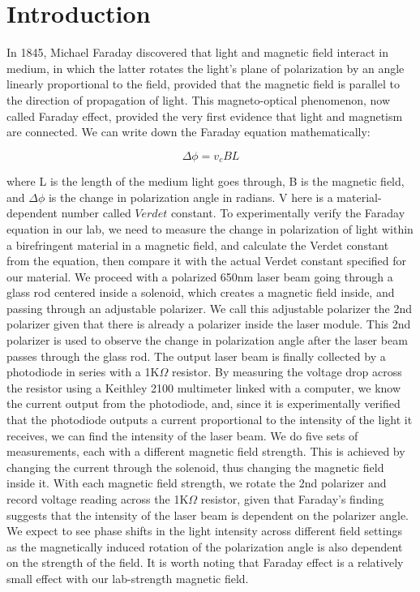 \documentclass[prb,preprint]{revtex4-1}
\begin{document}
\section{Introduction} 

In 1845, Michael Faraday discovered that light and magnetic field interact in medium, in which the latter rotates the light's plane of polarization by an angle linearly proportional to the field, provided that the magnetic field is parallel to the direction of propagation of light. This magneto-optical phenomenon, now called Faraday effect, provided the very first evidence that light and magnetism are connected. We can write down the Faraday equation mathematically:

\begin{equation*}
\label{faraday}
\Delta\phi =v_cBL
\end{equation*}

where L is the length of the medium light goes through, B is the magnetic field, and $\Delta\phi$ is the change in polarization angle in radians. V here is a material-dependent number called $Verdet$ constant.
To experimentally verify the Faraday equation in our lab, we need to measure the change in polarization of light within a birefringent material in a magnetic field, and calculate the Verdet constant from the equation, then compare it with the actual Verdet constant specified for our material. We proceed with a polarized 650nm laser beam going through a glass rod centered inside a solenoid, which creates a magnetic field inside, and passing through an adjustable polarizer. We call this adjustable polarizer the 2nd polarizer given that there is already a polarizer inside the laser module. This 2nd polarizer is used to observe the change in polarization angle after the laser beam passes through the glass rod. The output laser beam is finally collected by a photodiode in series with a 1K$\Omega$ resistor. By measuring the voltage drop across the resistor using a Keithley 2100 multimeter linked with a computer, we know the current output from the photodiode, and, since it is experimentally verified that the photodiode outputs a current proportional to the intensity of the light it receives, we can find the intensity of the laser beam. We do five sets of measurements, each with a different magnetic field strength. This is achieved by changing the current through the solenoid, thus changing the magnetic field inside it. With each magnetic field strength, we rotate the 2nd polarizer and record voltage reading across the 1K$\Omega$ resistor, given that Faraday's finding suggests that the intensity of the laser beam is dependent on the polarizer angle. We expect to see phase shifts in the light intensity across different field settings as the magnetically induced rotation of the polarization angle is also dependent on the strength of the field. It is worth noting that Faraday effect is a relatively small effect with our lab-strength magnetic field.
\end{document}
